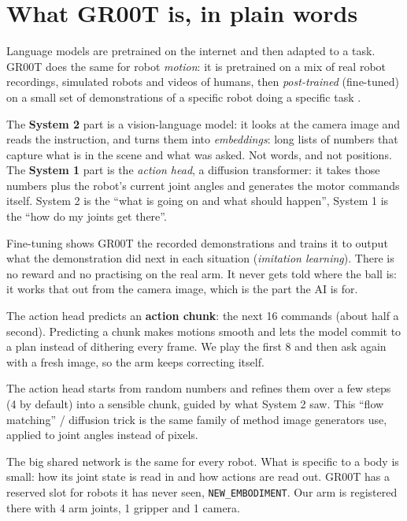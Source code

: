 \documentclass[11pt]{article}
\begin{document}
\section{What GR00T is, in plain words}

\begin{description}[leftmargin=0pt]
\item[A foundation model for robots.] Language models are pretrained on the internet and then
  adapted to a task. GR00T does the same for robot \emph{motion}: it is pretrained on a mix of
  real robot recordings, simulated robots and videos of humans, then \emph{post-trained}
  (fine-tuned) on a small set of demonstrations of a specific robot doing a specific task
  \cite{gr00tn1,isaacgr00t}.
\item[Two systems, like fast and slow thinking.] The \textbf{System 2} part is a
  vision-language model: it looks at the camera image and reads the instruction, and turns
  them into \emph{embeddings}: long lists of numbers that capture what is in the scene and what
  was asked. Not words, and not positions. The \textbf{System 1} part is the \emph{action
  head}, a diffusion transformer: it takes those numbers plus the robot's current joint angles
  and generates the motor commands itself. System 2 is the ``what is going on and what should
  happen'', System 1 is the ``how do my joints get there''.
\item[It learns by copying, not by trial and error.] Fine-tuning shows GR00T the recorded
  demonstrations and trains it to output what the demonstration did next in each situation
  (\emph{imitation learning}). There is no reward and no practising on the real arm. It never
  gets told where the ball is: it works that out from the camera image, which is the part the
  AI is for.
\item[It outputs a short plan, not one move.] The action head predicts an \textbf{action
  chunk}: the next 16 commands (about half a second). Predicting a chunk makes motions smooth
  and lets the model commit to a plan instead of dithering every frame. We play the first 8 and
  then ask again with a fresh image, so the arm keeps correcting itself.
\item[How it generates actions: denoising.] The action head starts from random numbers and
  refines them over a few steps (4 by default) into a sensible chunk, guided by what System 2
  saw. This ``flow matching'' / diffusion trick is the same family of method image generators
  use, applied to joint angles instead of pixels.
\item[One brain, many bodies.] The big shared network is the same for every robot. What is
  specific to a body is small: how its joint state is read in and how actions are read out.
  GR00T has a reserved slot for robots it has never seen, \texttt{NEW\_EMBODIMENT}. Our arm is
  registered there with 4 arm joints, 1 gripper and 1 camera.
\end{description}
\end{document}
